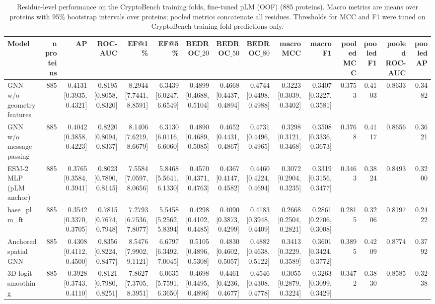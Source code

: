 \begin{table}[t]
\centering
\small
\caption{Residue-level performance on the CryptoBench training folds, fine-tuned pLM (OOF) (885 proteins). Macro metrics are means over proteins with 95\% bootstrap intervals over proteins; pooled metrics concatenate all residues. Thresholds for MCC and F1 were tuned on CryptoBench training-fold predictions only.}
\label{tab:table_absolute}
\begin{tabular}{lrrrrrrrrrrrrrr}
\toprule
Model & n proteins & AP & ROC-AUC & EF@1\% & EF@5\% & BEDROC$\_{20}$ & BEDROC$\_{50}$ & BEDROC$\_{80}$ & macro MCC & macro F1 & pooled MCC & pooled F1 & pooled ROC-AUC & pooled AP \\
\midrule
GNN w/o geometry features & 885 & 0.4131 [0.3935, 0.4321] & 0.8195 [0.8058, 0.8320] & 8.2944 [7.7441, 8.8591] & 6.3439 [6.0247, 6.6549] & 0.4899 [0.4688, 0.5104] & 0.4668 [0.4437, 0.4894] & 0.4744 [0.4498, 0.4988] & 0.3223 [0.3039, 0.3402] & 0.3407 [0.3227, 0.3581] & 0.3753 & 0.4103 & 0.8633 & 0.3482 \\
GNN w/o message passing & 885 & 0.4042 [0.3858, 0.4223] & 0.8220 [0.8094, 0.8337] & 8.1406 [7.6219, 8.6679] & 6.3130 [6.0116, 6.6060] & 0.4890 [0.4689, 0.5085] & 0.4652 [0.4431, 0.4867] & 0.4731 [0.4496, 0.4965] & 0.3298 [0.3121, 0.3468] & 0.3508 [0.3336, 0.3673] & 0.3768 & 0.4117 & 0.8656 & 0.3621 \\
ESM-2 MLP (pLM anchor) & 885 & 0.3765 [0.3584, 0.3941] & 0.8023 [0.7890, 0.8145] & 7.5584 [7.0597, 8.0656] & 5.8468 [5.5641, 6.1330] & 0.4570 [0.4371, 0.4763] & 0.4367 [0.4147, 0.4582] & 0.4460 [0.4224, 0.4694] & 0.3072 [0.2904, 0.3235] & 0.3319 [0.3156, 0.3477] & 0.3463 & 0.3824 & 0.8493 & 0.3200 \\
base\_plm\_ft & 885 & 0.3542 [0.3370, 0.3705] & 0.7815 [0.7674, 0.7948] & 7.2793 [6.7536, 7.8077] & 5.5458 [5.2562, 5.8394] & 0.4298 [0.4102, 0.4485] & 0.4090 [0.3873, 0.4299] & 0.4183 [0.3948, 0.4409] & 0.2668 [0.2504, 0.2821] & 0.2861 [0.2706, 0.3008] & 0.2815 & 0.3206 & 0.8197 & 0.2422 \\
Anchored spatial GNN & 885 & 0.4308 [0.4112, 0.4500] & 0.8356 [0.8224, 0.8477] & 8.5476 [7.9902, 9.1121] & 6.6797 [6.3492, 7.0045] & 0.5105 [0.4896, 0.5308] & 0.4830 [0.4602, 0.5057] & 0.4882 [0.4638, 0.5122] & 0.3413 [0.3229, 0.3589] & 0.3601 [0.3424, 0.3772] & 0.3895 & 0.4209 & 0.8774 & 0.3792 \\
3D logit smoothing & 885 & 0.3928 [0.3743, 0.4110] & 0.8121 [0.7980, 0.8251] & 7.8627 [7.3705, 8.3951] & 6.0635 [5.7591, 6.3650] & 0.4698 [0.4495, 0.4896] & 0.4461 [0.4236, 0.4677] & 0.4546 [0.4308, 0.4778] & 0.3055 [0.2879, 0.3224] & 0.3263 [0.3099, 0.3429] & 0.3472 & 0.3830 & 0.8585 & 0.3238 \\
\bottomrule
\end{tabular}
\end{table}
